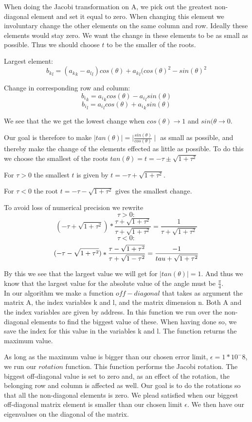 \documentclass[a4paper,12pt, english]{article}
\begin{document}
When doing the Jacobi transformation on A, we pick out the greatest non-diagonal element and set it equal to zero.
When changing this element we involuntary change the other elements on the same column and row. Ideally these elements would stay zero. We want the change in these elements to be as small as possible. Thus we should choose $t$ to be the smaller of the roots.

Largest element:
$$ {b_k}_l = ({a_k}_k - {a_l}_l) cos(\theta) + {a_k}_l(cos(\theta)^2 - sin(\theta)^2$$

Change in corresponding row and column:
$$ {b_i}_k = {a_i}_kcos(\theta) - {a_i}_lsin(\theta) $$
$$ {b_i}_l = {a_i}_lcos(\theta) + {a_i}_ksin(\theta) $$
  
We see that the we get the lowest change when $cos(\theta) \rightarrow 1$ and $sin(\theta \rightarrow 0$.

Our goal is therefore to make $ \mid tan(\theta) \mid  = \mid \frac{sin(\theta)}{cos(\theta)} \mid$ as small as possible, and thereby make the change of the elements effected as little as possible.
To do this we choose the smallest of the roots $tan(\theta) = t = - \tau \pm \sqrt{1+\tau^2}$

For $\tau > 0$ the smallest $t$ is given by $ t = - \tau + \sqrt{1+ \tau^2}$.

For $\tau < 0$ the root $ t = - \tau - \sqrt{1+ \tau^2}$ gives the smallest change.  
  
To avoid loss of numerical precision we rewrite
$$\tau>0:$$
$$(-\tau + \sqrt{1 + \tau^2}) * \frac{\tau + \sqrt{1+\tau^2}}{\tau + \sqrt{1+\tau^2}} = \frac{1}{\tau + \sqrt{1+\tau^2}} $$
$$\tau<0:$$
$$(-\tau - \sqrt{1 + \tau^2}) * \frac{\tau - \sqrt{1+\tau^2}}{\tau + \sqrt{1-\tau^2}} = \frac{-1}{\-tau + \sqrt{1+\tau^2}}$$

By this we see that the largest value we will get for $\mid tan(\theta) \mid = 1$. And thus we know that the largest value for the absolute value of the angle must be $\frac{\pi}{4}$. \\ 


In our algorithm we make a function $off-diagonal$ that takes as argument the matrix A, the index variables k and l, and the matrix dimension n. Both A and the index variables are given by address. In this function we run over the non-diagonal elements to find the biggest value of these. When having done so, we save the index for this value in the variables k and l. The function returns the maximum value. 

As long as the maximum value is bigger than our chosen error limit, $\epsilon = 1*10^-8$, we run our $rotation$ function. This function performs the Jacobi rotation. The biggest off-diagonal value is set to zero and, as an effect of the rotation, the belonging row and column is affected as well. Our goal is to do the rotations so that all the non-diagonal elements is zero. We plead satisfied when our biggest off-diagonal matrix element is smaller than our chosen limit $\epsilon$. We then have our eigenvalues on the diagonal of the matrix.
 
\end{document}
